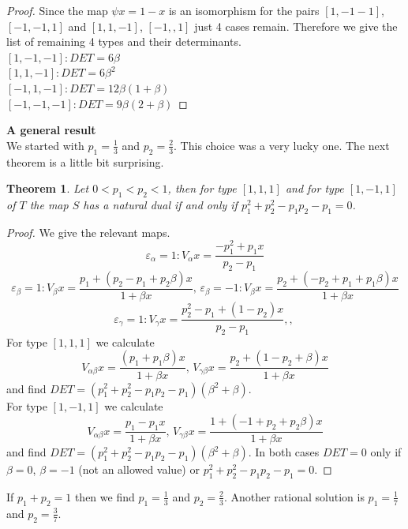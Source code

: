\documentclass[12pt]{article}
\newtheorem{theorem}{Theorem}
\begin{document}
	\begin{proof}
			Since the map $\psi x = 1-x$ is an isomorphism for the pairs $[1,-1-1]
	$, $[-1,-1,1]$ and $[1,1,-1]$, $[-1,,1]$ just 4 cases remain. Therefore we give the list of remaining 4 types and their determinants.\\
	$[1,-1,-1]: 	DET = 6 \beta$\\
	$[1,1,-1]: 		DET = 6\beta^2$\\
	$[-1,1,-1]: 	DET = 12\beta(1+\beta)	$\\
	$[-1,-1,-1]:	DET =  9\beta(2+\beta)$
	
\end{proof}

{\bf A general result}\\

We started with $p_1 =\frac{1}{3}$ and $p_2 = \frac{2}{3}$.  This choice was a very lucky one. The next theorem is a little bit surprising.

\begin{theorem}
	Let $0 < p_1 < p_2 < 1$, then for type $[1,1,1]$ and for type $[1,-1,1]$      of $T$ the map $S$ has a natural dual if and only if $p_1^2 + p_2^2 - p_1 p_2 - p_1 = 0$.
	\end{theorem}
\begin{proof}
We give the relevant maps.
	$$ \varepsilon_\alpha =1: V_\alpha x = \frac{-p_1^2 + p_1x}{p_2 - p_1}   $$          
$$ \varepsilon_\beta =1: V_\beta x = \frac{p_1 + (p_2 - p_1 +p_2\beta)x}{1 +  \beta x}, \, \varepsilon_\beta = -1 : V_\beta x= \frac{p_2 + (-p_2 + p_1 + p_1\beta )x}{1 + \beta x}$$
$$ \varepsilon_\gamma =1: V_\gamma x = \frac{p_2^2 -p_1 + (1-p_2)x}{p_2 - p_1}  , , \  $$	For type $[1,1,1]$ we calculate
$$V_{\alpha\beta} x = \frac{(p_1+p_1\beta)x}{1 + \beta x}, \, V_{\gamma\beta} x = \frac{p_2+(1 - p_2+\beta)x}{1 +  \beta x}$$
and find $DET = (p_1^2 + p_2^2 - p_1 p_2 - p_1)(\beta^2 + \beta)$.\\
For type $[1,-1,1]$ we calculate
 $$V_{\alpha\beta} x = \frac{p_1 - p_1x}{1 +  \beta x}, \,  V_{\gamma\beta} x = \frac{1 +(-1 + p_2 + p_2\beta)  x}{ 1+ \beta x}$$
 and find $DET = (p_1^2 + p_2^2 - p_1 p_2 - p_1)(\beta^2 + \beta)$.
In both cases $DET = 0$ only if $\beta =0$, $\beta = -1$ (not an allowed value) or $p_1^2 + p_2^2 - p_1 p_2 - p_1 = 0$.
\end{proof}
If $p_1 + p_2 =1$ then we find $p_1 = \frac{1}{3}$ and $p_2 = \frac{2}{3}$. Another rational solution is  $p_1 = \frac{1}{7}$ and $p_2 = \frac{3}{7}$.\\
\end{document}

